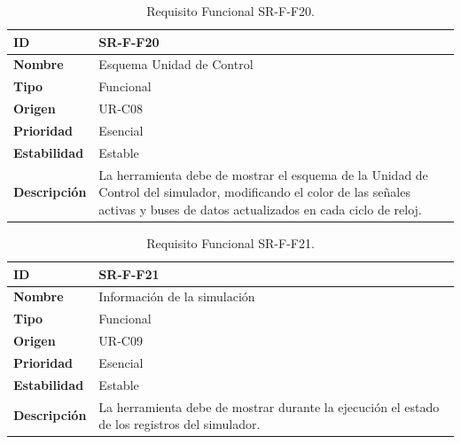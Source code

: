 \begin{center}
\begin{table}[htbp]
\centering
\begin{tabular}{@{}p{2.5cm} p{9cm}@{}} 
\toprule
\textbf{ID} 				& SR-F-F20 \\
\midrule
\textbf{Nombre} 			& Esquema Unidad de Control\\
\midrule
\textbf{Tipo} 			& Funcional \\
\midrule
\textbf{Origen} 			& UR-C08 \\
\midrule
\textbf{Prioridad}		& Esencial \\
\midrule
\textbf{Estabilidad} 		& Estable \\
\midrule
\textbf{Descripción} 	& La herramienta debe de mostrar el esquema de la Unidad de Control del simulador, modificando el color de las señales activas y buses de datos actualizados en cada ciclo de reloj. \\
\bottomrule
\end{tabular}
\caption{Requisito Funcional SR-F-F20.}
\label{tab:srff20}
\end{table}
\end{center}

\begin{center}
\begin{table}[htbp]
\centering
\begin{tabular}{@{}p{2.5cm} p{9cm}@{}} 
\toprule
\textbf{ID} 				& SR-F-F21\\
\midrule
\textbf{Nombre} 			& Información de la simulación\\
\midrule
\textbf{Tipo} 			& Funcional \\
\midrule
\textbf{Origen} 			& UR-C09 \\
\midrule
\textbf{Prioridad}		& Esencial \\
\midrule
\textbf{Estabilidad} 		& Estable \\
\midrule
\textbf{Descripción} 	& La herramienta debe de mostrar durante la ejecución el estado de los registros del simulador. \\
\bottomrule
\end{tabular}
\caption{Requisito Funcional SR-F-F21.}
\label{tab:srff21}
\end{table}
\end{center}





\iffalse

